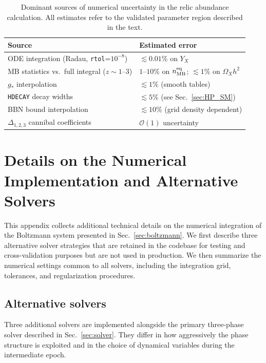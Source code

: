 \documentclass[11pt]{article}
\numberwithin{equation}{section}
\newcommand{\gstar}{g_*}
\newcommand{\neqMB}{n^{\text{eq}}_{\rm MB}}
\begin{document}
\begin{table}
\centering
\begin{tabular}{ll}
\toprule
Source & Estimated error \\
\midrule
ODE integration (Radau, \texttt{rtol}=$10^{-8}$) & $\lesssim 0.01\%$ on $Y_X$ \\
MB statistics vs.\ full integral ($z \sim 1$--$3$) & $1$--$10\%$ on $\neqMB$; $\lesssim 1\%$ on $\Omega_X h^2$ \\
$\gstar$ interpolation & $\lesssim 1\%$ (smooth tables) \\
\texttt{HDECAY} decay widths & $\lesssim 5\%$ (see Sec.~\ref{sec:HP_SM}) \\
BBN bound interpolation & $\lesssim 10\%$ (grid density dependent) \\
$\Delta_{1,2,3}$ cannibal coefficients & $\mathcal{O}(1)$ uncertainty \\
\bottomrule
\end{tabular}
\caption{Dominant sources of numerical uncertainty in the relic abundance calculation. All estimates refer to the validated parameter region described in the text.}
\label{tab:numerics}
\end{table}
 


\section{Details on the Numerical Implementation and Alternative Solvers}
\label{app:numerics}

This appendix collects additional technical details on the numerical integration of the Boltzmann system presented in Sec.~\ref{sec:boltzmann}. We first describe three alternative solver strategies that are retained in the codebase for testing and cross-validation purposes but are not used in production. We then summarize the numerical settings common to all solvers, including the integration grid, tolerances, and regularization procedures.

\subsection{Alternative solvers}
\label{app:legacy}

Three additional solvers are implemented alongside the primary three-phase solver described in Sec.~\ref{sec:solver}. They differ in how aggressively the phase structure is exploited and in the choice of dynamical variables during the intermediate epoch.
\end{document}
